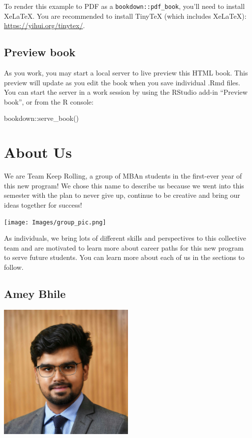 \documentclass[
]{book}
\newenvironment{Shaded}{\begin{snugshade}}{\end{snugshade}}
\newcommand{\FunctionTok}[1]{\textcolor[rgb]{0.00,0.00,0.00}{#1}}
\newcommand{\NormalTok}[1]{#1}
\newcommand{\SpecialCharTok}[1]{\textcolor[rgb]{0.00,0.00,0.00}{#1}}
\begin{document}
To render this example to PDF as a \texttt{bookdown::pdf\_book}, you'll need to install XeLaTeX. You are recommended to install TinyTeX (which includes XeLaTeX): \url{https://yihui.org/tinytex/}.

\hypertarget{preview-book}{%
\section{Preview book}\label{preview-book}}

As you work, you may start a local server to live preview this HTML book. This preview will update as you edit the book when you save individual .Rmd files. You can start the server in a work session by using the RStudio add-in ``Preview book'', or from the R console:

\begin{Shaded}
\begin{Highlighting}[]
\NormalTok{bookdown}\SpecialCharTok{::}\FunctionTok{serve\_book}\NormalTok{()}
\end{Highlighting}
\end{Shaded}

\hypertarget{about-us}{%
\chapter{About Us}\label{about-us}}

We are Team Keep Rolling, a group of MBAn students in the first-ever year of this new program! We chose this name to describe us because we went into this semester with the plan to never give up, continue to be creative and bring our ideas together for success!

\texttt{[image: Images/group\_pic.png]}

As individuals, we bring lots of different skills and perspectives to this collective team and are motivated to learn more about career paths for this new program to serve future students. You can learn more about each of us in the sections to follow.

\hypertarget{amey-bhile}{%
\section{Amey Bhile}\label{amey-bhile}}

\includegraphics[width=0.5\textwidth,height=\textheight]{Images/Amey.jpeg}
\end{document}
